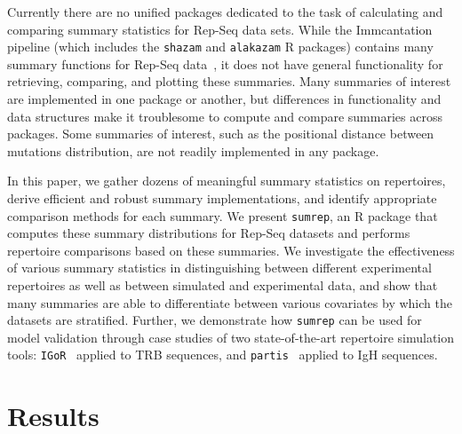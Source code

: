 \documentclass{article}
\newcommand{\partis}{\texttt{partis}}
\newcommand{\igor}{\texttt{IGoR}}
\begin{document}
Currently there are no unified packages dedicated to the task of calculating and comparing summary statistics for Rep-Seq data sets.
While the Immcantation pipeline (which includes the \texttt{shazam} and \texttt{alakazam} R packages) contains many summary functions for Rep-Seq data~\cite{Gupta2015-iu}, it does not have general functionality for retrieving, comparing, and plotting these summaries.
Many summaries of interest are implemented in one package or another, but differences in functionality and data structures make it troublesome to compute and compare summaries across packages.
Some summaries of interest, such as the positional distance between mutations distribution, are not readily implemented in any package.

In this paper, we gather dozens of meaningful summary statistics on repertoires, derive efficient and robust summary implementations, and identify appropriate comparison methods for each summary.
We present \texttt{sumrep}, an R package that computes these summary distributions for Rep-Seq datasets and performs repertoire comparisons based on these summaries.
We investigate the effectiveness of various summary statistics in distinguishing between different experimental repertoires as well as between simulated and experimental data, and show that many summaries are able to differentiate between various covariates by which the datasets are stratified.
Further, we demonstrate how \texttt{sumrep} can be used for model validation through case studies of two state-of-the-art repertoire simulation tools: \igor~\cite{Marcou2018-du} applied to TRB sequences, and \partis~\cite{Ralph2016-nw, Ralph2016-iz} applied to IgH sequences.


\section*{Results}
\end{document}

